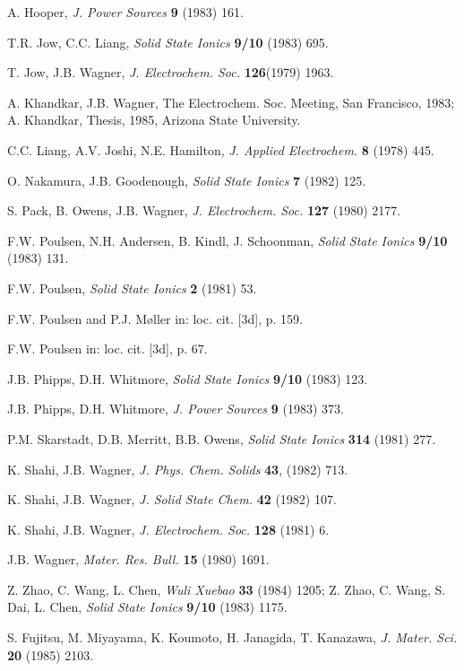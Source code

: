 \documentclass{elsart}
\begin{document}
\begin{thebibliography}{999}
 A. Hooper, {\em J. Power Sources\/} {\bf 9} (1983) 161.

 T.R. Jow, C.C. Liang, {\em Solid State Ionics\/} {\bf 9/10}
  (1983) 695.  

 T. Jow, J.B. Wagner, {\em J. Electrochem. Soc.\/} {\bf 126}(1979)
  1963.  

 A. Khandkar, J.B. Wagner, The Electrochem. Soc. Meeting,
San Francisco, 1983; A. Khandkar, Thesis, 1985, Arizona State University.

 C.C. Liang, A.V. Joshi, N.E. Hamilton, {\em J. Applied
Electrochem.\/} {\bf 8} (1978) 445.

 O. Nakamura, J.B. Goodenough, {\em Solid State Ionics\/} {\bf 7} 
(1982) 125.

 S. Pack, B. Owens, J.B. Wagner, {\em J. Electrochem. Soc.\/} {\bf 
127} (1980) 2177.

 F.W. Poulsen, N.H. Andersen, B. Kindl, J. Schoonman, {\em Solid
State Ionics\/} {\bf 9/10} (1983) 131.

 F.W. Poulsen, {\em Solid State Ionics\/} {\bf 2} (1981) 53.

 F.W. Poulsen and P.J. M\o ller in: loc. cit. [3d], p. 159.

 F.W. Poulsen in: loc. cit. [3d], p. 67.

 J.B. Phipps, D.H. Whitmore, {\em Solid State Ionics\/} {\bf 9/10}
 (1983) 123.

 J.B. Phipps, D.H. Whitmore, {\em J. Power Sources\/} {\bf 9}
  (1983) 373.  

 P.M. Skarstadt, D.B. Merritt, B.B. Owens, {\em Solid State
Ionics\/} {\bf 314} (1981) 277.

 K. Shahi, J.B. Wagner, {\em J. Phys. Chem. Solids\/} {\bf 43},
 (1982) 713.

 K. Shahi, J.B. Wagner, {\em J. Solid State Chem.\/} {\bf 42}  
(1982) 107. 

 K. Shahi, J.B. Wagner, {\em J. Electrochem. Soc.\/} {\bf 128}
(1981) 6.

 J.B. Wagner, {\em Mater. Res. Bull.\/} {\bf 15} (1980) 1691.

 Z. Zhao, C. Wang, L. Chen, {\em Wuli Xuebao\/} {\bf 33}
(1984) 1205; Z. Zhao, C. Wang, S. Dai, L. Chen, {\em Solid State Ionics\/} {\bf
  9/10} (1983) 1175.

 S. Fujitsu, M. Miyayama, K. Koumoto, H. Janagida, T. Kanazawa,
{\em J. Mater. Sci.\/} {\bf 20} (1985) 2103.


\end{thebibliography}
\end{document}
